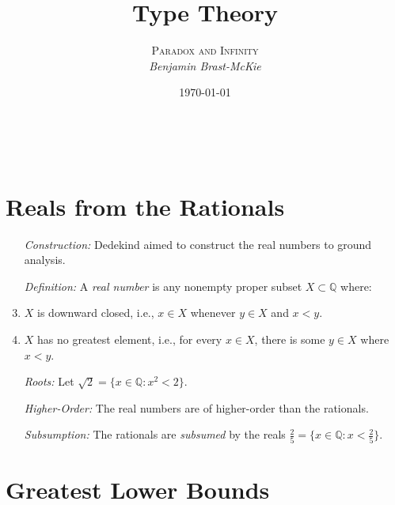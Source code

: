 \documentclass[a4paper, 11pt]{article} %
\title{\textbf{Type Theory}} %
\author{\textsc{Paradox and Infinity}\\ \em Benjamin Brast-McKie} %
\date{\today} %
\makeatletter
\newcommand{\set}[1]{\lbrace#1\rbrace} %
\newcommand{\Q}{\mathbb{Q}}
\renewcommand{\maketitle}{ %
\begin{flushright} %
{\LARGE\@title} %

\vspace{10pt} %

{\@author} %
\\\@date %

\vspace{0pt} %
\end{flushright}
}
\makeatother
\begin{document}
\maketitle %

\thispagestyle{empty}



%


\section*{Reals from the Rationals}

\begin{enumerate}
  \item[\it Construction:] Dedekind aimed to construct the real numbers to ground analysis.
  \item[\it Definition:] A \textit{real number} is any nonempty proper subset $X \subset \Q$ where: 
    \item $X$ is downward closed, i.e., $x \in X$ whenever $y\in X$ and $x < y$. 
    \item $X$ has no greatest element, i.e., for every $x \in X$, there is some $y \in X$ where $x < y$. 
  \item[\it Roots:] Let $\sqrt{2} = \set{x \in \Q : x^2 < 2}$.
  \item[\it Higher-Order:] The real numbers are of higher-order than the rationals.
  \item[\it Subsumption:] The rationals are \textit{subsumed} by the reals $\frac{2}{5} = \set{x \in \Q : x < \frac{2}{5}}$.
\end{enumerate}





\section*{Greatest Lower Bounds}
\end{document}
